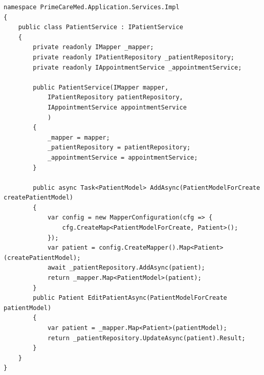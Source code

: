 \begin{lstlisting}[caption={Servis \texttt{PatientService}}, label=patientService]
namespace PrimeCareMed.Application.Services.Impl
{
    public class PatientService : IPatientService
    {
        private readonly IMapper _mapper;
        private readonly IPatientRepository _patientRepository;
        private readonly IAppointmentService _appointmentService;

        public PatientService(IMapper mapper,
            IPatientRepository patientRepository,
            IAppointmentService appointmentService
            )
        {
            _mapper = mapper;
            _patientRepository = patientRepository;
            _appointmentService = appointmentService;
        }

        public async Task<PatientModel> AddAsync(PatientModelForCreate createPatientModel)
        {
            var config = new MapperConfiguration(cfg => {
                cfg.CreateMap<PatientModelForCreate, Patient>();
            });
            var patient = config.CreateMapper().Map<Patient>(createPatientModel);
            await _patientRepository.AddAsync(patient);
            return _mapper.Map<PatientModel>(patient);
        }
        public Patient EditPatientAsync(PatientModelForCreate patientModel)
        {
            var patient = _mapper.Map<Patient>(patientModel);
            return _patientRepository.UpdateAsync(patient).Result;
        }
    }
}
\end{lstlisting}

